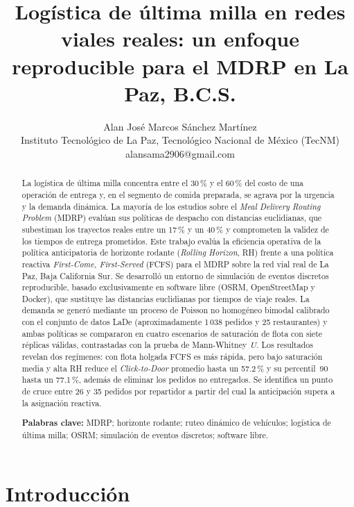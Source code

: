 \documentclass[12pt,letterpaper]{article}
\title{\textbf{Logística de última milla en redes viales reales: un enfoque
reproducible para el MDRP en La Paz, B.C.S.}}
\author{Alan José Marcos Sánchez Martínez\\
	\small Instituto Tecnológico de La Paz, Tecnológico Nacional de México (TecNM)\\
	\small alansama2906@gmail.com}
\date{}
\begin{document}
\maketitle

\begin{abstract}
\noindent La logística de última milla concentra entre el 30\,\% y el 60\,\% del
costo de una operación de entrega y, en el segmento de comida preparada, se
agrava por la urgencia y la demanda dinámica. La mayoría de los estudios sobre el
\textit{Meal Delivery Routing Problem} (MDRP) evalúan sus políticas de despacho
con distancias euclidianas, que subestiman los trayectos reales entre un 17\,\% y
un 40\,\% y comprometen la validez de los tiempos de entrega prometidos. Este
trabajo evalúa la eficiencia operativa de la política anticipatoria de horizonte
rodante (\textit{Rolling Horizon}, RH) frente a una política reactiva
\textit{First-Come, First-Served} (FCFS) para el MDRP sobre la red vial real de
La Paz, Baja California Sur. Se desarrolló un entorno de simulación de eventos
discretos reproducible, basado exclusivamente en software libre (OSRM,
OpenStreetMap y Docker), que sustituye las distancias euclidianas por tiempos de
viaje reales. La demanda se generó mediante un proceso de Poisson no homogéneo
bimodal calibrado con el conjunto de datos LaDe (aproximadamente 1\,038 pedidos y
25 restaurantes) y ambas políticas se compararon en cuatro escenarios de
saturación de flota con siete réplicas válidas, contrastadas con la prueba de
Mann-Whitney~$U$. Los resultados revelan dos regímenes: con flota holgada FCFS es
más rápida, pero bajo saturación media y alta RH reduce el \textit{Click-to-Door}
promedio hasta un 57.2\,\% y su percentil~90 hasta un 77.1\,\%, además de eliminar
los pedidos no entregados. Se identifica un punto de cruce entre 26 y 35 pedidos
por repartidor a partir del cual la anticipación supera a la asignación reactiva.

\vspace{0.4cm}
\noindent\textbf{Palabras clave:} MDRP; horizonte rodante; ruteo dinámico de
vehículos; logística de última milla; OSRM; simulación de eventos discretos;
software libre.
\end{abstract}

\section{Introducción}
\end{document}
